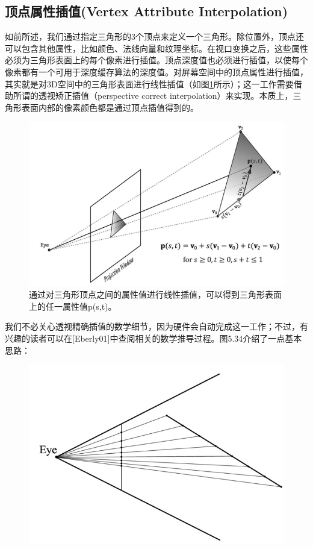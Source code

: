\documentclass[11pt,a4paper,oldfontcommands]{memoir}
\begin{document}
{\subsection{顶点属性插值(Vertex Attribute Interpolation)}
\begin{flushleft}
如前所述，我们通过指定三角形的3个顶点来定义一个三角形。除位置外，顶点还可以包含其他属性，比如颜色、法线向量和纹理坐标。在视口变换之后，这些属性必须为三角形表面上的每个像素进行插值。顶点深度值也必须进行插值，以使每个像素都有一个可用于深度缓存算法的深度值。对屏幕空间中的顶点属性进行插值，其实就是对3D空间中的三角形表面进行线性插值（如图\ref{fig:5-33}所示）；这一工作需要借助所谓的透视矫正插值（perspective
correct interpolation）来实现。本质上，三角形表面内部的像素颜色都是通过顶点插值得到的。
\end{flushleft}
\begin{figure}[h]
	\includegraphics[width=\textwidth]{5-33}
	\centering
	\caption{通过对三角形顶点之间的属性值进行线性插值，可以得到三角形表面上的任一属性值p(s,t)。}
	\label{fig:5-33}
\end{figure}
\begin{flushleft}
我们不必关心透视精确插值的数学细节，因为硬件会自动完成这一工作；不过，有兴趣的读者可以在[Eberly01]中查阅相关的数学推导过程。图5.34介绍了一点基本思路：
\end{flushleft}
\begin{figure}[h]
    \includegraphics[width=\textwidth]{5-34}

\end{figure}}
\end{document}
